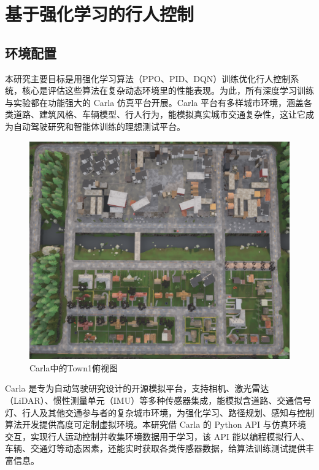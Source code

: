 \chapter{基于强化学习的行人控制}

\section{环境配置}

本研究主要目标是用强化学习算法（PPO、PID、DQN）训练优化行人控制系统，核心是评估这些算法在复杂动态环境里的性能表现。为此，所有深度学习训练与实验都在功能强大的 Carla 仿真平台开展。Carla 平台有多样城市环境，涵盖各类道路、建筑风格、车辆模型、行人行为，能模拟真实城市交通复杂性，这让它成为自动驾驶研究和智能体训练的理想测试平台。​

\begin{figure}[H]
    \centering
    \includegraphics[width=1\textwidth]{images/town1.pdf}
    \caption{Carla中的Town1俯视图}
    \label{fig:town1}
\end{figure}

Carla 是专为自动驾驶研究设计的开源模拟平台，支持相机、激光雷达（LiDAR）、惯性测量单元（IMU）等多种传感器集成，能模拟含道路、交通信号灯、行人及其他交通参与者的复杂城市环境，为强化学习、路径规划、感知与控制算法开发提供高度可定制虚拟环境。本研究借 Carla 的 Python API 与仿真环境交互，实现行人运动控制并收集环境数据用于学习，该 API 能以编程模拟行人、车辆、交通灯等动态因素，还能实时获取各类传感器数据，给算法训练测试提供丰富信息。​

